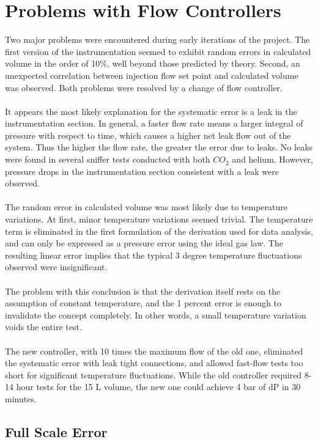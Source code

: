\documentclass{report}
\begin{document}
\section{Problems with Flow Controllers}
Two major problems were encountered during early iterations of the project. 
The first version of the instrumentation seemed to exhibit random errors in calculated volume in the order of 10\%, well beyond those predicted by theory. Second, an unexpected correlation between injection flow set point and calculated volume was observed. 
Both problems were resolved by a change of flow controller. \\ \\
It appears the most likely explanation for the systematic error is a leak in the instrumentation section. In general, a faster flow rate means a larger integral of pressure with respect to time, which causes a higher net leak flow out of the system. Thus the higher the flow rate, the greater the error due to leaks. No leaks were found in several sniffer tests conducted with both $CO_2$ and helium. However, pressure drops in the instrumentation section  consistent with a leak were observed. \\ \\
The random error in calculated volume was most likely due to temperature variations. At first, minor temperature variations seemed trivial. The temperature term is eliminated in the first formulation of the derivation used for data analysis, and can only be expressed as a pressure error using the ideal gas law. The resulting linear error implies that the typical 3 degree temperature fluctuations observed were insignificant. \\ \\ The problem with this conclusion is that the derivation itself rests on the assumption of constant temperature, and the 1 percent error is enough to invalidate the concept completely. In other words, a small temperature variation voids the entire test. \\ \\
The new controller, with 10 times the maximum flow of the old one,  eliminated the systematic error with leak tight connections, and allowed fast-flow tests too short for significant temperature fluctuations. While the old controller required 8-14 hour tests for the 15 L volume, the new one could achieve 4 bar of dP in 30 minutes.

\subsection{Full Scale Error}
\end{document}
